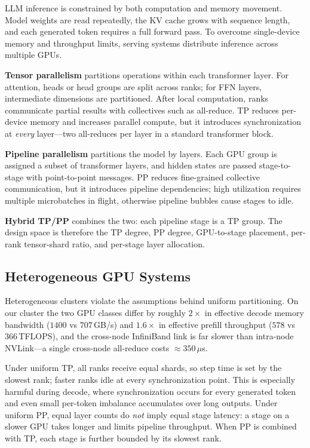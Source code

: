 \documentclass[twocolumn]{article}
\begin{document}
LLM inference is constrained by both computation and memory movement. Model weights are read repeatedly, the KV cache grows with sequence length, and each generated token requires a full forward pass. To overcome single-device memory and throughput limits, serving systems distribute inference across multiple GPUs.

\textbf{Tensor parallelism} partitions operations within each transformer layer. For attention, heads or head groups are split across ranks; for FFN layers, intermediate dimensions are partitioned. After local computation, ranks communicate partial results with collectives such as all-reduce. TP reduces per-device memory and increases parallel compute, but it introduces synchronization at \emph{every} layer---two all-reduces per layer in a standard transformer block.

\textbf{Pipeline parallelism} partitions the model by layers. Each GPU group is assigned a subset of transformer layers, and hidden states are passed stage-to-stage with point-to-point messages. PP reduces fine-grained collective communication, but it introduces pipeline dependencies; high utilization requires multiple microbatches in flight, otherwise pipeline bubbles cause stages to idle.

\textbf{Hybrid TP/PP} combines the two: each pipeline stage is a TP group. The design space is therefore the TP degree, PP degree, GPU-to-stage placement, per-rank tensor-shard ratio, and per-stage layer allocation.

\subsection{Heterogeneous GPU Systems}

Heterogeneous clusters violate the assumptions behind uniform partitioning. On our cluster the two GPU classes differ by roughly $2\times$ in effective decode memory bandwidth ($1400$ vs $707$\,GB/s) and $1.6\times$ in effective prefill throughput ($578$ vs $366$\,TFLOPS), and the cross-node InfiniBand link is far slower than intra-node NVLink---a single cross-node all-reduce costs $\approx\!350\,\mu$s.

Under uniform TP, all ranks receive equal shards, so step time is set by the slowest rank; faster ranks idle at every synchronization point. This is especially harmful during decode, where synchronization occurs for every generated token and even small per-token imbalance accumulates over long outputs. Under uniform PP, equal layer counts do \emph{not} imply equal stage latency: a stage on a slower GPU takes longer and limits pipeline throughput. When PP is combined with TP, each stage is further bounded by its slowest rank.
\end{document}

